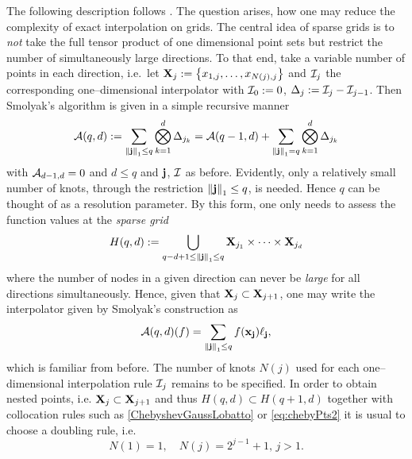 \documentclass[12pt, oneside]{amsart}
\theoremstyle{definition}
\theoremstyle{remark}
\numberwithin{equation}{section}
\begin{document}
The following description follows \cite{BarthelmannHighDim_2000}.
The question arises, how one may reduce the complexity of exact interpolation on grids. The central idea of sparse grids is to \emph{not} take the full tensor product of one dimensional point sets but restrict the number of simultaneously large directions. To that end, take a variable number of points in each direction, i.e.\ let \(\XX_j \defn \set{x_{1, j}, \dots, x_{N(j), j}}\) and \(\cI_j\) the corresponding one--dimensional interpolator with \(\cI_0 \defn 0\), \(\Delta_j \defn \cI_j - \cI_{j-1}\). Then Smolyak's algorithm is given in a simple recursive manner
\begin{equation}\label{Smolyak}
    \cA(q, d) \defn \sum_{\norm[1]{\bfj} \leq q} \bigotimes_{k=1}^d \Delta_{j_k} = \cA(q-1, d)+\sum_{\norm[1]{\bfj}=q} \bigotimes_{k=1}^d \Delta_{j_k}
\end{equation}
with \(\cA_{d-1, d} = 0\) and \(d \leq q\) and \(\bfj\), \(\cI\) as before. Evidently, only a relatively small number of knots, through the restriction \(\norm[1]{\bfj} \leq q\), is needed. Hence \(q\) can be thought of as a resolution parameter. By this form, one only needs to assess the function values at the \emph{sparse grid} \[
	H(q, d) \defn \bigcup_{q-d+1 \leq \norm[1]{\bfj} \leq q} \XX_{j_1} \times \cdots \times \XX_{j_d}
\]
where the number of nodes in a given direction can never be \emph{large} for all directions simultaneously. Hence, given that \(\XX_j \subset \XX_{j+1}\), one may write the interpolator given by Smolyak's construction as \[
	\cA(q, d)(f) = \sum_{\norm[1]{\bfj} \leq q} f(\bfx_\bfj) \ell_\bfj,
\]
which is familiar from before.
The number of knots \(N(j)\) used for each one--dimensional interpolation rule \(\cI_j\) remains to be specified. In order to obtain nested points, i.e. \(\XX_j \subset \XX_{j+1}\) and thus \(H(q, d) \subset H(q+1,d)\) together with collocation rules such as \cref{ChebyshevGaussLobatto} or \cref{eq:chebyPts2} it is usual to choose a doubling rule, i.e. \[
	N(1) = 1,\quad N(j) = 2^{j-1}+1,\, j > 1.
\]
\end{document}
